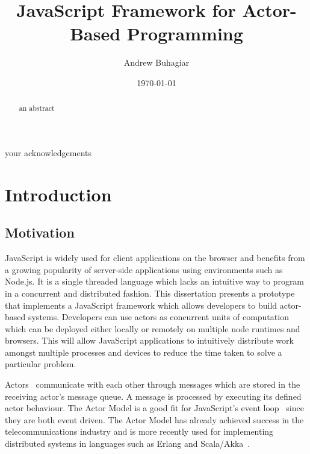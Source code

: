 \documentclass[12pt, a4paper]{report}
\theoremstyle{definition}
\theoremstyle{definition}%
\theoremstyle{definition}%
\theoremstyle{definition}%
\theoremstyle{definition}%
\theoremstyle{definition}%
\begin{document}
\title{JavaScript Framework for Actor-Based Programming}
\author{Andrew Buhagiar}
\date{\today}

\frontmatter


\begin{acknowledgements}
your acknowledgements
\end{acknowledgements}
       
\begin{abstract}
an abstract
\end{abstract}

\tableofcontents

\listoffigures

\listoftables



\mainmatter

\chapter{Introduction}
\section{Motivation}
JavaScript is widely used for client applications on the browser and benefits from a growing popularity of server-side applications using environments such as Node.js. It is a single threaded language which lacks an intuitive way to program in a concurrent and distributed fashion. This dissertation presents a prototype that implements a JavaScript framework which allows developers to build actor-based systems. Developers can use actors as concurrent units of computation which can be deployed either locally or remotely on multiple node runtimes and browsers. This will allow JavaScript applications to intuitively distribute work amongst multiple processes and devices to reduce the time taken to solve a particular problem.

Actors~\cite{hewitt1973session}\cite{43years} communicate with each other through messages which are stored in the receiving actor's message queue. A message is processed by executing its defined actor behaviour. The Actor Model is a good fit for JavaScript's event loop~\cite{eventloopbrowser}\cite{eventloopnode} since they are both event driven. The Actor Model has already achieved success in the telecommunications industry and is more recently used for implementing distributed systems in languages such as Erlang and Scala/Akka~\cite{haller2012integration}.
\end{document}
